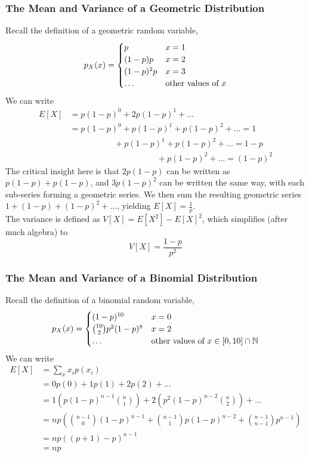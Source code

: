 \documentclass[11pt]{article}
\theoremstyle{definition}
\begin{document}
\subsubsection{The Mean and Variance of a Geometric Distribution}
Recall the definition of a geometric random variable,
\begin{equation*}
p_X(x) = \begin{cases}
p & x = 1\\
(1-p)p & x = 2 \\ 
(1-p)^2p & x = 3 \\
\dots & $other values of $ x
\end{cases}
\end{equation*}
We can write %
\begin{align*}
E[X] &= p(1-p)^0 + 2p(1-p)^1 + \dots \\
&= p(1-p)^0 + p(1-p)^1 + p(1-p)^2 + \dots = 1 \\
&\qquad \qquad \: \: \: \: \: \: + p(1-p)^1 + p(1-p)^2 + \dots = 1-p \\
& \qquad \qquad \qquad \qquad \qquad \: \: + p(1-p)^2 + \dots = (1-p)^2
\end{align*}
The critical insight here is that $2p(1-p)$ can be written as $p(1-p) + p(1-p)$, and $3p(1-p)^2$ can be written the same way, with each sub-series forming a geometric series. We then sum the resulting geometric series $1 + (1-p) + (1-p)^2 + \dots$, yielding $E[X] = \frac{1}{p}$. \\

\noindent The variance is defined as $V[X] = E[X^2] - E[X]^2$, which simplifies (after much algebra) to $$V[X] = \frac{1-p}{p^2}$$

\subsubsection{The Mean and Variance of a Binomial Distribution}
Recall the definition of a binomial random variable,
\begin{equation*}
p_X(x) = \begin{cases}
(1-p)^{10} & x = 0\\
{10 \choose 2}p^2(1-p)^8 & x = 2 \\
\dots & $other values of $ x \in [0, 10] \cap \mathbb{N}
\end{cases}
\end{equation*}
We can write
\begin{align*}
E[X] &= \sum_x x_i p(x_i) \\
&= 0p(0) + 1p(1) + 2p(2) + \dots \\
&= 1\left(p(1-p)^{n-1} {n \choose 1}\right) + 2 \left(p^2(1-p)^{n-2} {n \choose 2} \right) + \dots \\
&=  np \left({n-1 \choose 0} (1-p)^{n-1} + {n-1 \choose 1} p(1-p)^{n-2} + {n-1 \choose n-1}p^{n-1}\right) \\
&= np((p+1)-p)^{n-1} \\
&= np
\end{align*}
\end{document}
